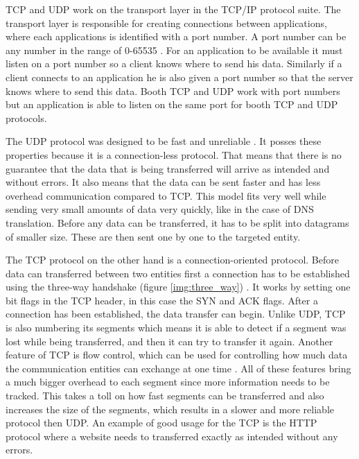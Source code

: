 TCP and UDP work on the transport layer in the TCP/IP protocol suite. The transport layer is responsible for creating connections between applications, where each applications is identified with a port number. A port number can be any number in the range of 0-65535 \cite{Forouzan2010}. For an application to be available it must listen on a port number so a client knows where to send his data. Similarly if a client connects to an application he is also given a port number so that the server knows where to send this data. Booth TCP and UDP work with port numbers but an application is able to listen on the same port for booth TCP and UDP protocols.

The UDP protocol was designed to be fast and unreliable \cite{Forouzan2010}. It posses these properties because it is a connection-less protocol. That means that there is no guarantee that the data that is being transferred will arrive as intended and without errors. It also means that the data can be sent faster and has less overhead communication compared to TCP. This model fits very well while sending very small amounts of data very quickly, like in the case of DNS translation. Before any data can be transferred, it has to be split into datagrams of smaller size. These are then sent one by one to the targeted entity.

The TCP protocol on the other hand is a connection-oriented protocol. Before data can transferred between two entities first a connection has to be established using the three-way handshake (figure \ref{img:three_way}) \cite{Forouzan2010}. It works by setting one bit flags in the TCP header, in this case the SYN and ACK flags. After a connection has been established, the data transfer can begin. Unlike UDP, TCP is also numbering its segments which means it is able to detect if a segment was lost while being transferred, and then it can try to transfer it again. Another feature of TCP is flow control, which can be used for controlling how much data the communication entities can exchange at one time \cite{Forouzan2010}. All of these features bring a much bigger overhead to each segment since more information needs to be tracked. This takes a toll on how fast segments can be transferred and also increases the size of the segments, which results in a slower and more reliable protocol then UDP. An example of good usage for the TCP is the HTTP protocol where a website needs to transferred exactly as intended without any errors.



